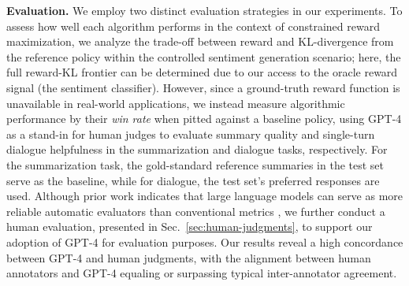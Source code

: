 \textbf{Evaluation.} We employ two distinct evaluation strategies in our experiments. To assess how well each algorithm performs in the context of constrained reward maximization, we analyze the trade-off between reward and KL-divergence from the reference policy within the controlled sentiment generation scenario; here, the full reward-KL frontier can be determined due to our access to the oracle reward signal (the sentiment classifier). However, since a ground-truth reward function is unavailable in real-world applications, we instead measure algorithmic performance by their \textit{win rate} when pitted against a baseline policy, using GPT-4 as a stand-in for human judges to evaluate summary quality and single-turn dialogue helpfulness in the summarization and dialogue tasks, respectively. For the summarization task, the gold-standard reference summaries in the test set serve as the baseline, while for dialogue, the test set’s preferred responses are used. Although prior work indicates that large language models can serve as more reliable automatic evaluators than conventional metrics \citep{Chen2023ExploringTU}, we further conduct a human evaluation, presented in Sec.~\ref{sec:human-judgments}, to support our adoption of GPT-4 for evaluation purposes. Our results reveal a high concordance between GPT-4 and human judgments, with the alignment between human annotators and GPT-4 equaling or surpassing typical inter-annotator agreement.

